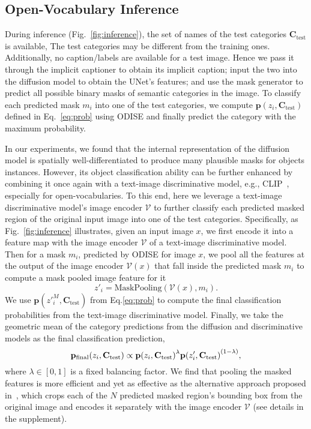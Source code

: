 \documentclass[10pt,twocolumn,letterpaper]{article}
\newcommand{\ourmethod}{ODISE}
\begin{document}
\subsection{Open-Vocabulary Inference}
\label{sec:inference}

During inference (Fig.~\ref{fig:inference}), the set of names of the test categories $\mathbf{C}_\text{test}$ is available, The test categories may be different from the training ones.
Additionally, no caption/labels are available for a test image. 
Hence we pass it through the implicit captioner to obtain its implicit caption; input the two into the diffusion model to obtain the UNet's features; and use the mask generator to predict all possible binary masks of semantic categories in the image.
To classify each predicted mask $m_i$ into one of the test categories, we compute $\mathbf{p}(z_i, \mathbf{C}_\text{test})$ defined in Eq.~\ref{eq:prob} using \ourmethod{} and finally predict the category with the maximum probability. 

In our experiments, we found that the internal representation of the diffusion model is spatially well-differentiated to produce many plausible masks for objects instances. However, its object classification ability can be further enhanced by combining it once again with a text-image discriminative model, e.g., CLIP~\cite{radford2021clip}, especially for open-vocabularies.
To this end, here we leverage a text-image discriminative model's image encoder $\mathcal{V}$ to further classify each predicted masked region of the original input image into one of the test categories. 
Specifically, as Fig.~\ref{fig:inference} illustrates, given an input image $x$, we first encode it into a feature map with the image encoder $\mathcal{V}$ of a text-image discriminative model. 
Then for a mask $m_i$, predicted by \ourmethod{} for image $x$, we pool all the features at the output of the image encoder $\mathcal{V}(x)$ that fall inside the predicted mask $m_i$ to compute a mask pooled image feature for it 
\begin{equation}
z'_i = \text{MaskPooling}(\mathcal{V}(x), m_i).
\end{equation}
We use $\mathbf{p}(z'^M_i, \mathbf{C}_\text{test})$ from Eq.\ref{eq:prob} to compute the final classification probabilities from the text-image discriminative model. 
Finally, we take the geometric mean of the category predictions from the diffusion and discriminative models as the final classification prediction,
\vspace{-1em}
\begin{equation}
   {\mathbf{p}_\text{final} (z_i, \mathbf{C}_\text{test})} \propto {\mathbf{p}(z_i, \mathbf{C}_\text{test})}^\lambda{\mathbf{p}(z'_i, \mathbf{C}_\text{test})}^{(1-\lambda)},
   \vspace{-.5em}
\end{equation} where $\lambda \in [0, 1]$ is a fixed balancing factor.
We find that pooling the masked features is more efficient and yet as effective as the alternative approach proposed in~\cite{ding2022zegformer,gu2021vild}, which crops each of the $N$ predicted masked region's bounding box from the original image and encodes it separately with the image encoder $\mathcal{V}$ (see details in the supplement).
\end{document}
